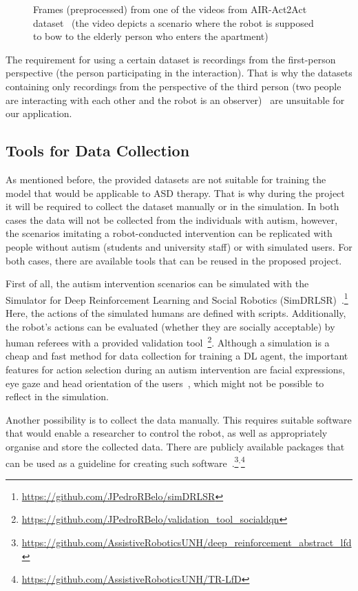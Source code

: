 \documentclass[thesis]{mas_proposal}
\begin{document}
\begin{figure}[htb!]
\begin{subfigure}[b]{0.22\textwidth}
		\subcaption{}%
		\label{subfig:seq4}
	\end{subfigure}
	\caption{Frames (preprocessed) from one of the videos from AIR-Act2Act dataset~\cite{Ko2021} (the video depicts a scenario where the robot is supposed to bow to the elderly person who enters the apartment)}
	\label{fig:act2act_sample}
\end{figure}

The requirement for using a certain dataset is recordings from the first-person perspective (the person participating in the interaction). That is why the datasets containing only recordings from the perspective of the third person (two people are interacting with each other and the robot is an observer)~\cite{Hu2013,UT-Interaction-Data,Gemeren2016,Yun2012} are unsuitable for our application.

\subsection{Tools for Data Collection}

As mentioned before, the provided datasets are not suitable for training the model that would be applicable to ASD therapy. That is why during the project it will be required to collect the dataset manually or in the simulation. In both cases the data will not be collected from the individuals with autism, however, the scenarios imitating a robot-conducted intervention can be replicated with people without autism (students and university staff) or with simulated users. For both cases, there are available tools that can be reused in the proposed project.

First of all, the autism intervention scenarios can be simulated with the Simulator for Deep Reinforcement Learning and Social Robotics (SimDRLSR)~\cite{Belo2021}.\footnote{\url{https://github.com/JPedroRBelo/simDRLSR}} Here, the actions of the simulated humans are defined with scripts. Additionally, the robot's actions can be evaluated (whether they are socially acceptable) by human referees with a provided validation tool~\cite{Belo2022}\footnote{\url{https://github.com/JPedroRBelo/validation_tool_socialdqn}}. Although a simulation is a cheap and fast method for data collection for training a DL agent, the important features for action selection during an autism intervention are facial expressions, eye gaze and head orientation of the users~\cite{stolarz2022learningbased}, which might not be possible to reflect in the simulation.

Another possibility is to collect the data manually. This requires suitable software that would enable a researcher to control the robot, as well as appropriately organise and store the collected data. There are publicly available packages that can be used as a guideline for creating such software~\cite{Turner2018,carpio2018learning,carpio2019learning}.\footnote{\url{https://github.com/AssistiveRoboticsUNH/deep_reinforcement_abstract_lfd}}$^,$\footnote{\url{https://github.com/AssistiveRoboticsUNH/TR-LfD}}
\end{document}
